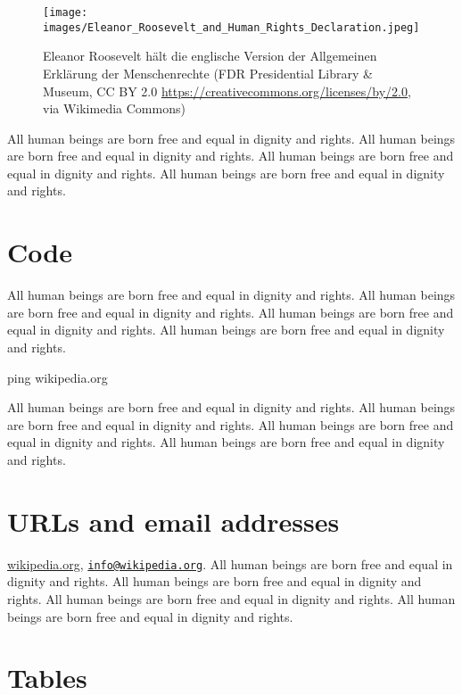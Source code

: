 \documentclass[
  titlepage,
  openright,
  DIV=calc,
  toc=listof,
  listof=nochaptergap]{scrbook}
\newenvironment{Shaded}{}{}
\newcommand{\FunctionTok}[1]{\textcolor[rgb]{0.02,0.16,0.49}{#1}}
\newcommand{\NormalTok}[1]{#1}
\begin{document}
\begin{figure}
\centering
\texttt{[image: images/Eleanor\_Roosevelt\_and\_Human\_Rights\_Declaration.jpeg]}
\caption{Eleanor Roosevelt hält die englische Version der Allgemeinen
Erklärung der Menschenrechte (FDR Presidential Library \& Museum, CC BY
2.0 \url{https://creativecommons.org/licenses/by/2.0}, via Wikimedia
Commons)}\label{fig:eleanor}
\end{figure}

All human beings are born free and equal in dignity and rights. All
human beings are born free and equal in dignity and rights. All human
beings are born free and equal in dignity and rights. All human beings
are born free and equal in dignity and rights.

\section{Code}\label{code}

All human beings are born free and equal in dignity and rights. All
human beings are born free and equal in dignity and rights. All human
beings are born free and equal in dignity and rights. All human beings
are born free and equal in dignity and rights.

\begin{Shaded}
\begin{Highlighting}[]
\FunctionTok{ping}\NormalTok{ wikipedia.org}
\end{Highlighting}
\end{Shaded}

All human beings are born free and equal in dignity and rights. All
human beings are born free and equal in dignity and rights. All human
beings are born free and equal in dignity and rights. All human beings
are born free and equal in dignity and rights.

\section{URLs and email addresses}\label{urls-and-email-addresses}

\href{https://www.wikipedia.org/}{wikipedia.org},
\href{mailto:info@wikipedia.org}{\nolinkurl{info@wikipedia.org}}. All
human beings are born free and equal in dignity and rights. All human
beings are born free and equal in dignity and rights. All human beings
are born free and equal in dignity and rights. All human beings are born
free and equal in dignity and rights.

\section{Tables}\label{tables}
\end{document}
